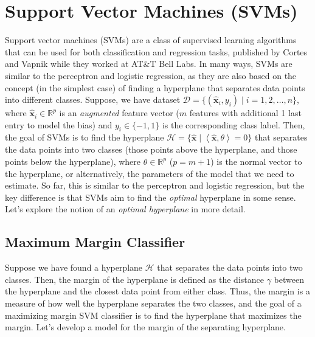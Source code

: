 \documentclass{article}[11pt]
\def\R{\mathbb{R}}
\begin{document}
\section{Support Vector Machines (SVMs)}\label{sec:svm}
Support vector machines (SVMs) are a class of supervised learning algorithms that can be used for both classification and regression tasks, 
published by Cortes and Vapnik \cite{Cortes:1995aa} while they worked at AT\&T Bell Labs.
In many ways, SVMs are similar to the perceptron and logistic regression, as they are also based on the concept (in the simplest case) of finding a hyperplane that separates data points into different classes.
Suppose, we have dataset $\mathcal{D} = \{(\hat{\mathbf{x}}_{i}, y_{i}) \mid i = 1,2,\dots,n\}$, where $\hat{\mathbf{x}}_i \in \R^p$ is an \textit{augmented} feature vector ($m$ features with additional 1 last entry to model the bias) and $y_i \in \{-1, 1\}$ is the corresponding class label.
Then, the goal of SVMs is to find the hyperplane $\mathcal{H} = \{\hat{\mathbf{x}} \mid \left<\hat{\mathbf{x}},\theta\right> = 0\}$ that separates the data points into two classes (those points above the hyperplane, and those points below the hyperplane), 
where $\theta \in \R^{p}$ ($p=m+1$) is the normal vector to the hyperplane, or alternatively, the parameters of the model that we need to estimate.
So far, this is similar to the perceptron and logistic regression, but the key difference is that SVMs aim to find the \textit{optimal} hyperplane in some sense. 
Let's explore the notion of an \textit{optimal hyperplane} in more detail.

\subsection{Maximum Margin Classifier}\label{sec:max-margin}
Suppose we have found a hyperplane $\mathcal{H}$ that separates the data points into two classes.
Then, the margin of the hyperplane is defined as the distance $\gamma$ between the hyperplane and the closest data point from either class.
Thus, the margin is a measure of how well the hyperplane separates the two classes, and the goal of a maximizing margin SVM classifier is to find the hyperplane that maximizes the margin.
Let's develop a model for the margin of the separating hyperplane.
\end{document}
